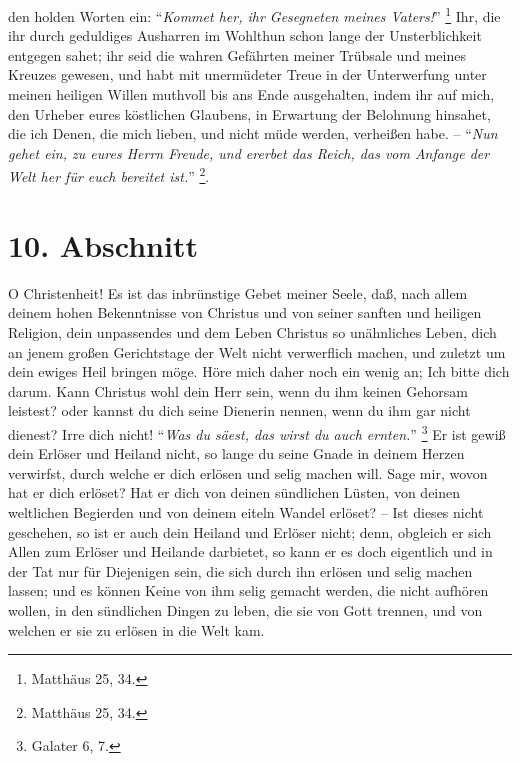 den holden Worten ein:
"`\textit{Kommet her, ihr Gesegneten meines Vaters!}"' \footnote{Matthäus 25,
34.} 
Ihr, die ihr durch geduldiges Ausharren im Wohlthun schon lange der
Unsterblichkeit entgegen sahet;
ihr seid die wahren Gefährten meiner Trübsale und meines Kreuzes gewesen, und
habt mit unermüdeter Treue in der Unterwerfung unter meinen heiligen Willen
muthvoll bis ans Ende ausgehalten, indem ihr auf mich, den Urheber eures
köstlichen Glaubens, in Erwartung der Belohnung hinsahet, die ich Denen, die
mich lieben, und nicht müde werden, verheißen habe.
-- "`\textit{Nun gehet ein, zu eures Herrn Freude, und ererbet das Reich, das
vom Anfange der Welt her für euch bereitet ist.}"' \footnote{Matthäus 25, 34.}.

\section{10. Abschnitt}

O Christenheit!
Es ist das inbrünstige Gebet meiner Seele, daß, nach allem deinem hohen
Bekenntnisse von Christus und von seiner sanften und heiligen Religion, dein
unpassendes und dem Leben Christus so unähnliches Leben, dich an jenem großen
Gerichtstage der Welt nicht verwerflich machen, und zuletzt um dein ewiges Heil
bringen möge.
Höre mich daher noch ein wenig an;
Ich bitte dich darum.
Kann Christus wohl dein Herr sein, wenn du ihm keinen Gehorsam leistest?
oder kannst du dich seine Dienerin nennen, wenn du ihm gar nicht dienest? Irre
dich nicht!
"`\textit{Was du säest, das wirst du auch ernten.}"' \footnote{Galater 6, 7.}
Er ist gewiß dein Erlöser und Heiland nicht, so lange du seine Gnade in deinem
Herzen verwirfst, durch welche er dich erlösen und selig machen will.
Sage mir, wovon hat er dich erlöset? 
Hat er dich von deinen sündlichen Lüsten, von deinen weltlichen Begierden und
von deinem eiteln Wandel erlöset?
-- Ist dieses nicht geschehen, so ist er auch dein Heiland und Erlöser nicht;
denn, obgleich er sich Allen zum Erlöser und Heilande darbietet, so kann er es
doch eigentlich und in der Tat nur für Diejenigen sein, die sich durch ihn
erlösen und selig machen lassen;
und es können Keine von ihm selig gemacht werden, die nicht aufhören wollen, in
den sündlichen Dingen zu leben, die sie von Gott trennen, und von welchen er sie
zu erlösen in die Welt kam.

